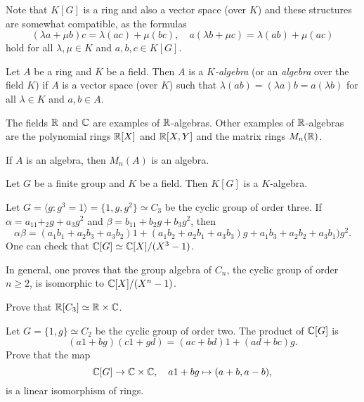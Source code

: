 Note that $K[G]$ is a ring and also a vector space (over $K$) and these structures
are somewhat compatible, as the formulas 
\[
(\lambda a+\mu b)c=\lambda (ac)+\mu (bc),\quad
a(\lambda b+\mu c)=\lambda (ab)+\mu (ac)
\]
hold for all $\lambda,\mu\in K$ and $a,b,c\in K[G]$. 

\begin{definition}
Let $A$ be a ring and $K$ be a field. Then $A$ is a \emph{$K$-algebra} (or an \emph{algebra} 
over the field $K$) if $A$ is a vector space (over $K$)
such that $\lambda(ab)=(\lambda a)b=a(\lambda b)$ for all $\lambda\in K$ and $a,b\in A$. 
\end{definition}

The fields $\mathbb{R}$ and $\mathbb{C}$ are examples of $\mathbb{R}$-algebras. 
Other examples of $\mathbb{R}$-algebras are the 
polynomial rings $\mathbb{R}[X]$ and $\mathbb{R}[X,Y]$ and the matrix rings $M_n(\mathbb{R})$.  

\begin{example}
	If $A$ is an algebra, then $M_n(A)$ is an algebra.	
\end{example}

\begin{example}
    Let $G$ be a finite group and $K$ be a field. Then $K[G]$ is a $K$-algebra. 
\end{example}

\begin{example}
	Let $G=\langle g:g^3=1\rangle=\{1,g,g^2\}\simeq C_3$ be the cyclic group of order three. 
	If $\alpha=a_11+_2g+a_3g^2$ and $\beta=b_11+b_2g+b_3g^2$, then
	\[
		\alpha\beta=(a_1b_1+a_2b_3+a_3b_2)1+(a_1b_2+a_2b_1+a_3b_3)g+a_1b_3+a_2b_2+a_3b_1)g^2.
	\]
	One can check that $\mathbb{C}[G]\simeq\mathbb{C}[X]/(X^3-1)$. 
\end{example}

In general, one proves that the group algebra of $C_n$, the cyclic group of order $n\geq2$, 
is isomorphic to $\mathbb{C}[X]/(X^n-1)$.

\begin{exercise}
\label{xca:RC3}
	Prove that $\mathbb{R}[C_3]\simeq\mathbb{R}\times\mathbb{C}$. 	
\end{exercise}

\begin{exercise}
	Let $G=\{1,g\}\simeq C_2$ be the cyclic group of order two. The product
	of $\mathbb{C}[G]$ is 
	\[
	(a1+bg)(c1+gd)=(ac+bd)1+(ad+bc)g.
	\]
	Prove that the map 
 \[
 \mathbb{C}[G]\to \mathbb{C}\times \mathbb{C},\quad a1+bg\mapsto (a+b,a-b),
 \]
	is a linear isomorphism of rings. 
\end{exercise}

